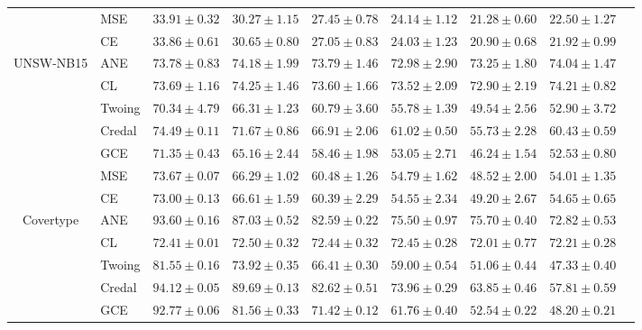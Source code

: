 \documentclass[letterpaper]{article} %
\begin{document}
\begin{table}[t]
\begin{tabular}{clccccccc}
 & MSE    & $\mathbf{33.91 \pm 0.32}$ & $\mathbf{30.27 \pm 1.15}$ & $\mathbf{27.45 \pm 0.78}$ & $\mathbf{24.14 \pm 1.12}$ & $\mathbf{21.28 \pm 0.60}$ & $\mathbf{22.50 \pm 1.27}$ \\
 & CE     & $\mathbf{33.86 \pm 0.61}$ & $\mathbf{30.65 \pm 0.80}$ & $\mathbf{27.05 \pm 0.83}$ & $\mathbf{24.03 \pm 1.23}$ & $\mathbf{20.90 \pm 0.68}$ & $\mathbf{21.92 \pm 0.99}$ \\
\hline
\multirow{7}{*}{UNSW-NB15}
 & ANE    & $\mathbf{73.78 \pm 0.83}$ & $\mathbf{74.18 \pm 1.99}$ & $\mathbf{73.79 \pm 1.46}$ & $\mathbf{72.98 \pm 2.90}$ & $\mathbf{73.25 \pm 1.80}$ & $\mathbf{74.04 \pm 1.47}$ \\
 & CL     & $\mathbf{73.69 \pm 1.16}$ & $\mathbf{74.25 \pm 1.46}$ & $\mathbf{73.60 \pm 1.66}$ & $\mathbf{73.52 \pm 2.09}$ & $\mathbf{72.90 \pm 2.19}$ & $\mathbf{74.21 \pm 0.82}$ \\
 & Twoing & $70.34 \pm 4.79$ & $66.31 \pm 1.23$ & $60.79 \pm 3.60$ & $55.78 \pm 1.39$ & $49.54 \pm 2.56$ & $52.90 \pm 3.72$ \\
 & Credal & $\mathbf{74.49 \pm 0.11}$ & $71.67 \pm 0.86$ & $66.91 \pm 2.06$ & $61.02 \pm 0.50$ & $55.73 \pm 2.28$ & $60.43 \pm 0.59$ \\
 & GCE    & $71.35 \pm 0.43$ & $65.16 \pm 2.44$ & $58.46 \pm 1.98$ & $53.05 \pm 2.71$ & $46.24 \pm 1.54$ & $52.53 \pm 0.80$ \\
 & MSE    & $73.67 \pm 0.07$ & $66.29 \pm 1.02$ & $60.48 \pm 1.26$ & $54.79 \pm 1.62$ & $48.52 \pm 2.00$ & $54.01 \pm 1.35$ \\
 & CE     & $73.00 \pm 0.13$ & $66.61 \pm 1.59$ & $60.39 \pm 2.29$ & $54.55 \pm 2.34$ & $49.20 \pm 2.67$ & $54.65 \pm 0.65$ \\
\hline
\multirow{7}{*}{Covertype}
 & ANE    & $93.60 \pm 0.16$ & $87.03 \pm 0.52$ & $\mathbf{82.59 \pm 0.22}$ & $\mathbf{75.50 \pm 0.97}$ & $\mathbf{75.70 \pm 0.40}$ & $\mathbf{72.82 \pm 0.53}$ \\
 & CL     & $72.41 \pm 0.01$ & $72.50 \pm 0.32$ & $72.44 \pm 0.32$ & $72.45 \pm 0.28$ & $72.01 \pm 0.77$ & $\mathbf{72.21 \pm 0.28}$ \\
 & Twoing & $81.55 \pm 0.16$ & $73.92 \pm 0.35$ & $66.41 \pm 0.30$ & $59.00 \pm 0.54$ & $51.06 \pm 0.44$ & $47.33 \pm 0.40$ \\
 & Credal & $94.12 \pm 0.05$ & $\mathbf{89.69 \pm 0.13}$ & $\mathbf{82.62 \pm 0.51}$ & $73.96 \pm 0.29$ & $63.85 \pm 0.46$ & $57.81 \pm 0.59$ \\
 & GCE    & $92.77 \pm 0.06$ & $81.56 \pm 0.33$ & $71.42 \pm 0.12$ & $61.76 \pm 0.40$ & $52.54 \pm 0.22$ & $48.20 \pm 0.21$ \\

\end{tabular}
\end{table}
\end{document}
